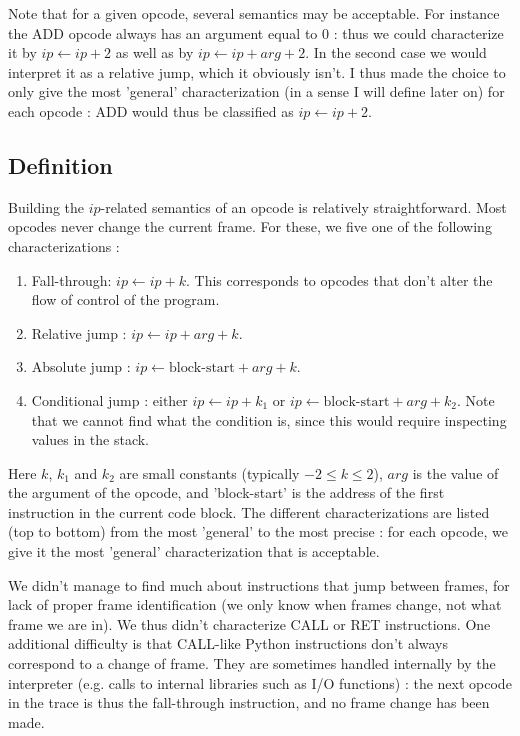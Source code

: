 \documentclass[english]{article}
\begin{document}
Note that for a given opcode, several semantics may be acceptable. For instance the ADD opcode always has an argument equal to $0$ : thus we could characterize it by $ip \leftarrow ip + 2$ as well as by $ip \leftarrow ip + arg + 2$. In the second case we would interpret it as a relative jump, which it obviously isn't. I thus made the choice to only give the most 'general' characterization (in a sense I will define later on) for each opcode : ADD would thus be classified as $ip \leftarrow ip + 2$.

\subsection{Definition}

Building the $ip$-related semantics of an opcode is relatively straightforward. Most opcodes never change the current frame. For these, we five one of the following characterizations :
\begin{enumerate}
	\item Fall-through: $ip \leftarrow ip + k$. This corresponds to opcodes that don't alter the flow of control of the program.
	\item Relative jump : $ip \leftarrow ip + arg + k$.
	\item Absolute jump : $ip \leftarrow \textrm{block-start} + arg + k$.
	\item Conditional jump : $\textrm{either } ip \leftarrow ip + k_1 \textrm{ or } ip \leftarrow \textrm{block-start} + arg + k_2$. Note that we cannot find what the condition is, since this would require inspecting values in the stack.
\end{enumerate}
Here $k$, $k_1$ and $k_2$ are small constants (typically $-2 \leq k \leq 2$), $arg$ is the value of the argument of the opcode, and 'block-start' is the address of the first instruction in the current code block. 
The different characterizations are listed (top to bottom) from the most 'general' to the most precise : for each opcode, we give it the most 'general' characterization that is acceptable.

We didn't manage to find much about instructions that jump between frames, for lack of proper frame identification (we only know when frames change, not what frame we are in). We thus didn't characterize CALL or RET instructions. One additional difficulty is that CALL-like Python instructions don't always correspond to a change of frame. They are sometimes handled internally by the interpreter (e.g. calls to internal libraries such as I/O functions) : the next opcode in the trace is thus the fall-through instruction, and no frame change has been made.
\end{document}
